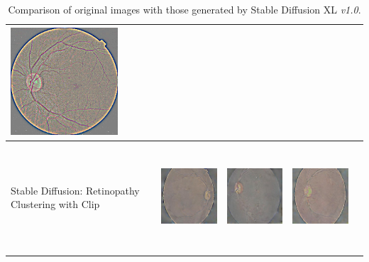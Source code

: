 \begin{table}[H]
\begin{tabularx}{\linewidth}{@{}>{\centering\arraybackslash}m{3cm}>{\centering\arraybackslash}X>{\centering\arraybackslash}X>{\centering\arraybackslash}X>{\centering\arraybackslash}X@{}}
\includegraphics[valign=M,width=\linewidth,height=4cm,keepaspectratio]{main/content/images/retinopatia_dreambooth_comparison/real/2.png} \\
\midrule
Stable Diffusion: Retinopathy Clustering with Clip &
\includegraphics[valign=M,width=\linewidth,height=4cm,keepaspectratio]{main/content/images/sd_dreambooth/dreambooth_xl_v1/ret/ret_1.jpeg} & 
\includegraphics[valign=M,width=\linewidth,height=4cm,keepaspectratio]{main/content/images/sd_dreambooth/dreambooth_xl_v1/ret/ret_2.jpeg} & 
\includegraphics[valign=M,width=\linewidth,height=4cm,keepaspectratio]{main/content/images/sd_dreambooth/dreambooth_xl_v1/ret/ret_3.jpeg} \\
\midrule
\bottomrule
\end{tabularx}
\caption{Comparison of original images with those generated by Stable Diffusion XL \textit{v1.0}.}
\label{tab:image_comparison_dreambooth_xl}
\end{table}

